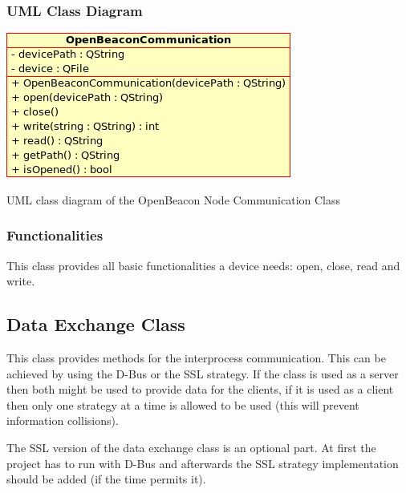    \subsubsection{UML Class Diagram}
     \begin{staticFigure}
      \centering
      \includegraphics[scale=0.7]{UMLDiagrams/OpenBeaconCommunication.png}
      \caption{UML class diagram of the OpenBeacon Node Communication Class}
      \label{fg:projectModularization:obCommunication}
     \end{staticFigure}

    \subsubsection{Functionalities}
     This class provides all basic functionalities a device needs: open, close, read and write.

   \subsection{Data Exchange Class}
    \label{sec:design:dataExchange}
    This class provides methods for the interprocess communication. This can be achieved by using the D-Bus or the SSL strategy. If the class is used as a server then both might be used to provide data for the clients, if it is used as a client then only one strategy at a time is allowed to be used (this will prevent information collisions).

    The SSL version of the data exchange class is an optional part. At first the project has to run with D-Bus and afterwards the SSL strategy implementation should be added (if the time permits it).

